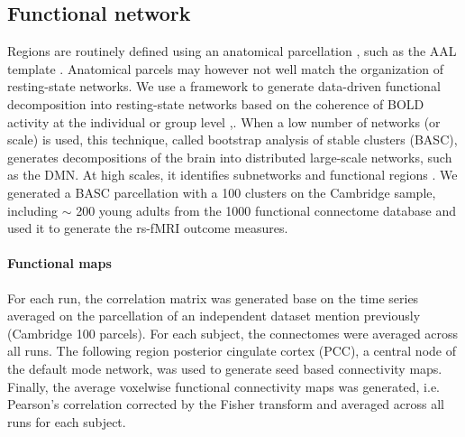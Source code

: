 \documentclass[authoryear]{elsarticle}
\begin{document}
\subsection{Functional network}
Regions are routinely defined using an anatomical parcellation \citep{He2009}, such as the AAL template \citep{Tzourio-Mazoyer2002}. Anatomical parcels may however not well match the organization of resting-state networks. We use a framework to generate data-driven functional decomposition into resting-state networks based on the coherence of BOLD activity at the individual or group level \citep{Bellec2006},\citep{Bellec2010c}. When a low number of networks (or scale) is used, this technique, called bootstrap analysis of stable clusters (BASC), generates decompositions of the brain into distributed large-scale networks, such as the DMN. At high scales, it identifies subnetworks and functional regions \citep{Kelly2012}. We generated a BASC parcellation with a 100 clusters on the Cambridge sample, including $\sim$ 200 young adults from the 1000 functional connectome database \citep{Biswal2010} and used it to generate the rs-fMRI outcome measures.

\paragraph{Functional maps}
For each run, the correlation matrix was generated base on the time series averaged on the parcellation of an independent dataset mention previously (Cambridge 100 parcels). For each subject, the connectomes were averaged across all runs. The following region posterior cingulate cortex (PCC), a central node of the default mode network, was used to generate seed based connectivity maps. Finally, the average voxelwise functional connectivity maps was generated, i.e. Pearson's correlation corrected by the Fisher transform and averaged across all runs for each subject.
\end{document}
